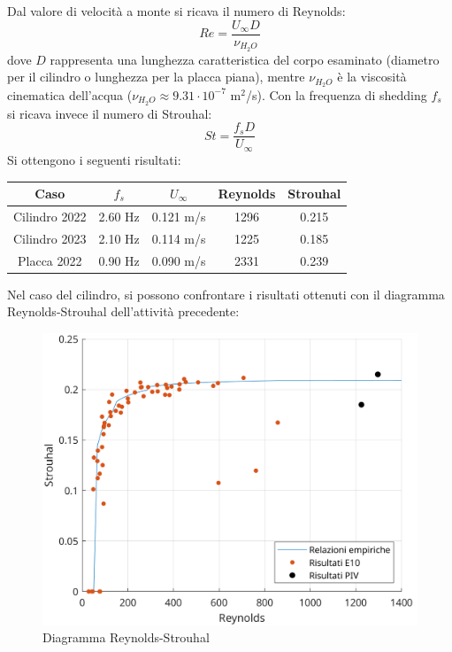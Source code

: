 \noindent Dal valore di velocità a monte si ricava il numero di Reynolds:
\begin{equation*}
    Re = \frac{U_\infty D}{\nu_{H_2O} }
\end{equation*}
dove $D$ rappresenta una lunghezza caratteristica del corpo esaminato (diametro per il cilindro o lunghezza per la placca piana), mentre $\nu_{H_2O}$ è la viscosità cinematica dell'acqua ($\nu_{H_2O}\approx 9.31\cdot10^{-7}$ m$^2$/s). Con la frequenza di shedding $f_s$ si ricava invece il numero di Strouhal:
\begin{equation*}
    St = \frac{f_s D}{U_\infty}
\end{equation*}
Si ottengono i seguenti risultati:
\begin{table}[H]
    \centering
    \begin{tabular}{|c|c|c|c|c|}
    \hline
    Caso          & $f_s$   & $U_\infty$ & Reynolds & Strouhal \\ \hline
    Cilindro 2022 & 2.60 Hz & 0.121 m/s  & 1296     & 0.215    \\ \hline
    Cilindro 2023 & 2.10 Hz & 0.114 m/s  & 1225     & 0.185    \\ \hline
    Placca 2022   & 0.90 Hz & 0.090 m/s  & 2331     & 0.239    \\ \hline
    \end{tabular}
\end{table}

\noindent Nel caso del cilindro, si possono confrontare i risultati ottenuti con il diagramma Reynolds-Strouhal dell'attività precedente:
\begin{figure}[H]
    \centering
    \includegraphics[width=.75\textwidth]{images/11/Re-St.png}
    \caption{Diagramma Reynolds-Strouhal}
\end{figure}

